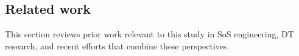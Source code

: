 % 









\subsection{Related work}\label{sec:relatedwork}
This section reviews prior work relevant to this study in SoS engineering, DT research, and recent efforts that combine these perspectives. 

